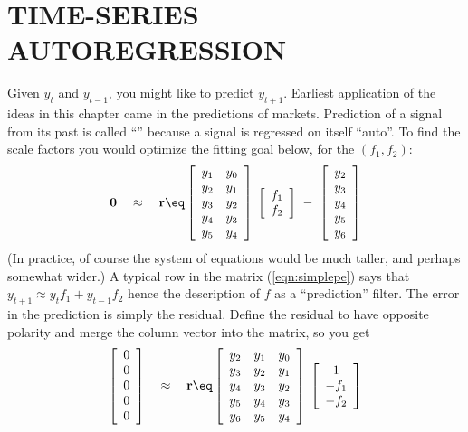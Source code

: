 \section{TIME-SERIES AUTOREGRESSION}
Given $y_t$ and $y_{t-1}$, you might like to predict $y_{t+1}$.
Earliest application of the ideas in this chapter
came in the predictions of markets.
Prediction of a signal from its past is called ``''
because a signal is regressed on itself ``auto''.
To find the scale factors you would optimize the fitting goal below,
for the  $(f_1,f_2)$:
\begin{equation}
\bold 0
\quad \approx \quad
\bold r \eq
\left[ 
\begin{array}{ccc}
  y_1 & y_0 \\
  y_2 & y_1  \\
  y_3 & y_2  \\
  y_4 & y_3  \\
  y_5 & y_4  \end{array} \right] 
\; \left[ 
\begin{array}{c}
  f_1 \\ 
  f_2 \end{array} \right]
\ -\ 
\left[ 
\begin{array}{c}
  y_2 \\ 
  y_3 \\ 
  y_4 \\ 
  y_5 \\ 
  y_6 \end{array} \right] 
  \label{eqn:simplepe}
\end{equation}
(In practice, of course the system of equations would be
much taller, and perhaps somewhat wider.)
A typical row in the matrix (\ref{eqn:simplepe})
says that $y_{t+1} \approx y_t f_1 + y_{t-1} f_2$
hence the description of $f$ as a ``prediction'' filter.
The error in the prediction is simply the residual.
Define the residual to have opposite polarity
and merge the column vector into the matrix, so you get
\begin{equation}
\left[ 
\begin{array}{c}
  0 \\ 
  0 \\ 
  0 \\ 
  0 \\ 
  0 \end{array} \right] 
\quad \approx \quad
\bold r \eq
\left[ 
\begin{array}{ccc}
  y_2 & y_1 & y_0 \\
  y_3 & y_2 & y_1  \\
  y_4 & y_3 & y_2  \\
  y_5 & y_4 & y_3  \\
  y_6 & y_5 & y_4  \end{array} \right] 
\; \left[ 
\begin{array}{c}
  1 \\ 
  -f_1 \\ 
  -f_2 \end{array} \right]
  \label{eqn:simplepef}
\end{equation}
